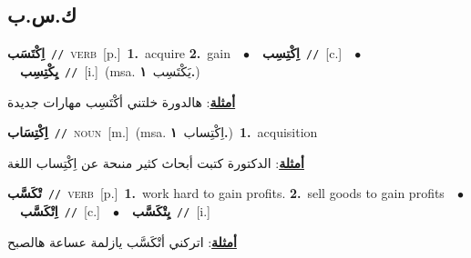 \documentclass[10pt,a4paper,twoside]{article} %
\begin{document}
\begin{multicols}{2}
\vspace{-3mm}
\subsection*{\color{blue}\foreignlanguage{arabic}{ك.س.ب}\color{blue}{}} 

{\setlength\topsep{0pt}\textbf{\foreignlanguage{arabic}{اِكْتَسَب}}\ {\color{gray}\texttt{//}\color{black}}\ \textsc{verb}\ [p.]\ \textbf{1.}~acquire  \textbf{2.}~gain\ \ $\bullet$\ \ \setlength\topsep{0pt}\textbf{\foreignlanguage{arabic}{اِكْتِسِب}}\ {\color{gray}\texttt{//}\color{black}}\ [c.]\ \ $\bullet$\ \ \setlength\topsep{0pt}\textbf{\foreignlanguage{arabic}{يِكْتِسِب}}\ {\color{gray}\texttt{//}\color{black}}\ [i.]\ \color{gray}(msa. \foreignlanguage{arabic}{يَكْتَسِب}~\foreignlanguage{arabic}{\textbf{١.}})\color{black}\  \begin{flushright}\color{gray}\foreignlanguage{arabic}{\textbf{\underline{\foreignlanguage{arabic}{أمثلة}}}: هالدورة خلتني أكْتَسِب مهارات جديدة}\end{flushright}\color{black}} \vspace{2mm}

{\setlength\topsep{0pt}\textbf{\foreignlanguage{arabic}{اِكْتِسَاب}}\ {\color{gray}\texttt{//}\color{black}}\ \textsc{noun}\ [m.]\ \color{gray}(msa. \foreignlanguage{arabic}{اِكْتِساب}~\foreignlanguage{arabic}{\textbf{١.}})\color{black}\ \textbf{1.}~acquisition\  \begin{flushright}\color{gray}\foreignlanguage{arabic}{\textbf{\underline{\foreignlanguage{arabic}{أمثلة}}}: الدكتورة كتبت أبحاث كثير منىحة عن اِكْتِساب اللغة}\end{flushright}\color{black}} \vspace{2mm}

{\setlength\topsep{0pt}\textbf{\foreignlanguage{arabic}{تْكَسَّب}}\ {\color{gray}\texttt{//}\color{black}}\ \textsc{verb}\ [p.]\ \textbf{1.}~work hard to gain profits.  \textbf{2.}~sell goods to gain profits\ \ $\bullet$\ \ \setlength\topsep{0pt}\textbf{\foreignlanguage{arabic}{اِتْكَسَّب}}\ {\color{gray}\texttt{//}\color{black}}\ [c.]\ \ $\bullet$\ \ \setlength\topsep{0pt}\textbf{\foreignlanguage{arabic}{يِتْكَسَّب}}\ {\color{gray}\texttt{//}\color{black}}\ [i.]\  \begin{flushright}\color{gray}\foreignlanguage{arabic}{\textbf{\underline{\foreignlanguage{arabic}{أمثلة}}}: اتركني أتْكَسَّب يازلمة عساعة هالصبح}\end{flushright}\color{black}} \vspace{2mm}


\end{multicols}
\end{document}

